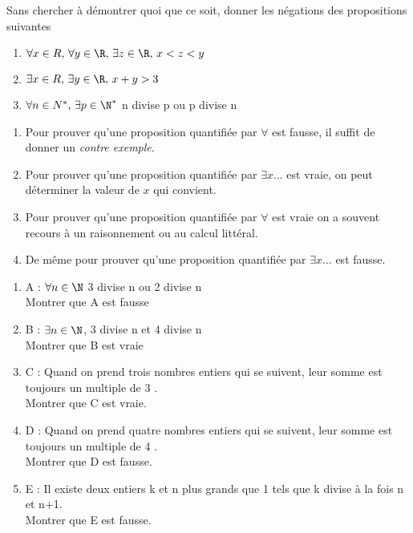 \documentclass[a4paper,12pt]{article}
\begin{document}

\exo{}

Sans chercher à démontrer quoi que ce soit, donner les négations des propositions suivantes

\begin{enumerate}[\bfseries 1.]
	\item 	$\forall x\in R,\, \forall y\in\R,\, \exists z\in \R,\, x<z<y$
	\item 	$\exists x\in R,\, \exists y\in\R,\, x+y>3$
	\item 	$\forall n\in N^*,\, \exists p\in\N^*$ n divise p ou p divise n\\
\end{enumerate}

\exo{}
\begin{methode}
	\begin{enumerate}[\textbullet]
		\item 	Pour prouver qu'une proposition quantifiée par $\forall$ est fausse, il suffit de donner un \textit{contre exemple}.
		\item 	Pour prouver qu'une proposition quantifiée par $\exists x...$ est vraie, on peut déterminer la valeur de $x$ qui convient.
		\item 	Pour prouver qu'une proposition quantifiée par $\forall$ est vraie on a souvent recours à un raisonnement ou au calcul littéral.
		\item 	De même pour prouver qu'une proposition quantifiée par $\exists x...$ est fausse.
	\end{enumerate}
\end{methode}

\begin{enumerate}[\bfseries 1.]
	\item 	A : $\forall n \in \N$ 3 divise n ou 2 divise n\\
			Montrer que A est fausse
	\item 	B : $\exists n \in \N$, 3 divise n et 4 divise n\\
			Montrer que B est vraie
	\item 	C : \og Quand on prend trois nombres entiers qui se suivent, leur somme est toujours un multiple de 3 \fg.\\
			Montrer que C est vraie.
	
	\item 	D : \og Quand on prend quatre nombres entiers qui se suivent, leur somme est toujours un multiple de 4 \fg.\\
				Montrer que D est fausse.
	\item 	E : \og Il existe deux entiers k et n plus grands que 1 tels que k divise à la fois n et n+1.\\
				Montrer que E est fausse. 
\end{enumerate}
\end{document}
